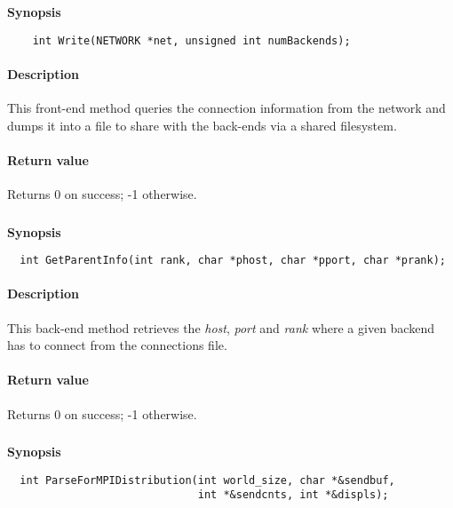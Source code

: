 \documentclass[twoside,a4,english,11pt]{book}
\begin{document}
\textbf{Synopsis}
\begin{lstlisting}
    int Write(NETWORK *net, unsigned int numBackends);
\end{lstlisting}

\paragraph{Description}
    This front-end method queries the connection information from the network and dumps it into a file to 
    share with the back-ends via a shared filesystem.
    
\paragraph{Return value}
    Returns 0 on success; -1 otherwise.


\subsubsection{}
 
\textbf{Synopsis}
\begin{lstlisting}
  int GetParentInfo(int rank, char *phost, char *pport, char *prank);
\end{lstlisting}

\paragraph{Description}
  This back-end method retrieves the \emph{host}, \emph{port} and \emph{rank} where a given backend has to connect from the connections file.

\paragraph{Return value}
  Returns 0 on success; -1 otherwise.
    

\subsubsection{}

\textbf{Synopsis}
\begin{lstlisting}
  int ParseForMPIDistribution(int world_size, char *&sendbuf, 
                              int *&sendcnts, int *&displs);
\end{lstlisting}
\end{document}
